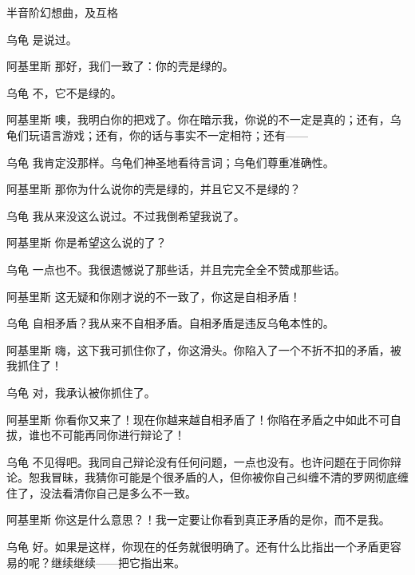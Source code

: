 \begin{dialog}{半音阶幻想曲，及互格}
\begin{dialogue}
\item[乌龟]是说过。

\item[阿基里斯]那好，我们一致了：你的壳是绿的。

\item[乌龟]不，它不是绿的。

\item[阿基里斯]噢，我明白你的把戏了。你在暗示我，你说的不一定是真的；还有，乌龟们玩语言游戏；还有，你的话与事实不一定相符；还有——

\item[乌龟]我肯定没那样。乌龟们神圣地看待言词；乌龟们尊重准确性。

\item[阿基里斯]那你为什么说你的壳是绿的，并且它又不是绿的？

\item[乌龟]我从来没这么说过。不过我倒希望我说了。

\item[阿基里斯]你是希望这么说的了？

\item[乌龟]一点也不。我很遗憾说了那些话，并且完完全全不赞成那些话。

\item[阿基里斯]这无疑和你刚才说的不一致了，你这是自相矛盾！

\item[乌龟]自相矛盾？我从来不自相矛盾。自相矛盾是违反乌龟本性的。

\item[阿基里斯]嗨，这下我可抓住你了，你这滑头。你陷入了一个不折不扣的矛盾，被我抓住了！

\item[乌龟]对，我承认被你抓住了。

\item[阿基里斯]你看你又来了！现在你越来越自相矛盾了！你陷在矛盾之中如此不可自拔，谁也不可能再同你进行辩论了！

\item[乌龟]不见得吧。我同自己辩论没有任何问题，一点也没有。也许问题在于同你辩论。恕我冒昧，我猜你可能是个很矛盾的人，但你被你自己纠缠不清的罗网彻底缠住了，没法看清你自己是多么不一致。

\item[阿基里斯]你这是什么意思？！我一定要让你看到真正矛盾的是你，而不是我。

\item[乌龟]好。如果是这样，你现在的任务就很明确了。还有什么比指出一个矛盾更容易的呢？继续继续——把它指出来。


\end{dialogue}
\end{dialog}
